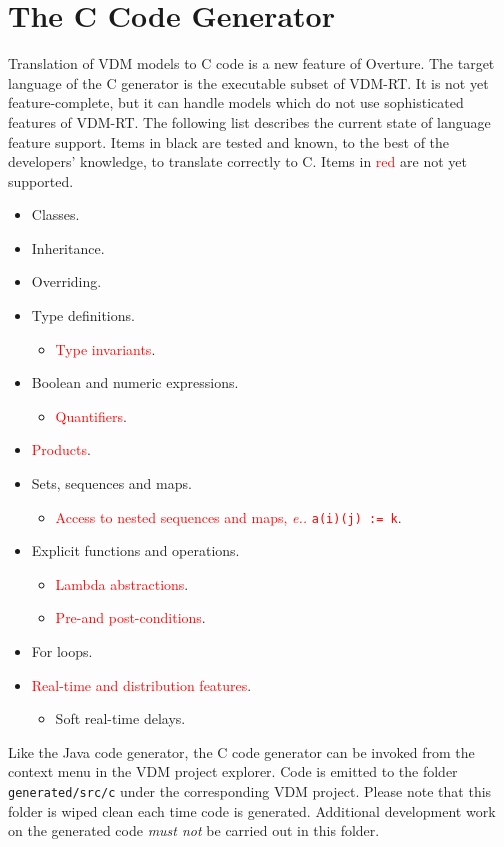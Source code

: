 \section{The C Code Generator}
Translation of VDM models to C code is a new feature of Overture.
%
The target language of the C generator is the executable subset of VDM-RT.
%
It is not yet feature-complete, but it can handle models which do not use sophisticated features of VDM-RT.
%
The following list describes the current state of language feature support.
%
Items in black are tested and known, to the best of the developers' knowledge, to translate correctly to C.
%
Items in \textcolor{red}{red} are not yet supported.
%
%
%
\begin{itemize}
%
\item  Classes.
%
\item  Inheritance.
%
\item  Overriding.
%
\item  Type definitions.
\begin{itemize}
\item  \textcolor{red}{Type invariants}.
\end{itemize}
%
\item  Boolean and numeric expressions.
\begin{itemize}
\item  \textcolor{red}{Quantifiers}.
\end{itemize}
%
\item  \textcolor{red}{Products}.
%
\item  Sets, sequences and maps.
\begin{itemize}
\item  \textcolor{red}{Access to nested sequences and maps, \emph{e.\@g.\@} \texttt{a(i)(j) := k}}.
\end{itemize}
%
\item  Explicit functions and operations.
\begin{itemize}
\item  \textcolor{red}{Lambda abstractions}.
\item  \textcolor{red}{Pre-\@ and post-conditions}.
\end{itemize}
%
\item  For loops.

%
\item  \textcolor{red}{Real-time and distribution features}.
\begin{itemize}
\item  Soft real-time delays.
\end{itemize}
%
\end{itemize}

Like the Java code generator, the C code generator can be invoked from the context menu in the VDM project explorer.
%
Code is emitted to the folder \texttt{generated/src/c} under the corresponding VDM project.
%
Please note that this folder is wiped clean each time code is generated.
%
Additional development work on the generated code \emph{must not} be carried out in this folder.
